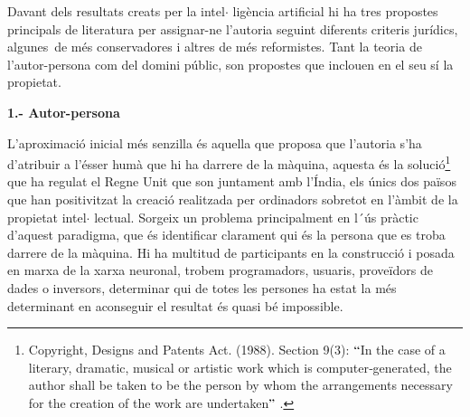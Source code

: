 \documentclass[12pt]{article}
\begin{document}
\vspace{\baselineskip}

\vspace{\baselineskip}
\begin{justify}
Davant dels resultats creats per la intel$ \cdot $ ligència artificial hi ha tres propostes principals de literatura per assignar-ne l’autoria seguint diferents criteris jurídics, algunes\ de més  conservadores i altres de més reformistes. Tant la teoria de l’autor-persona com del domini públic, son propostes que inclouen en el seu sí la propietat. 
\end{justify}\par


\vspace{\baselineskip}
\textbf{1.- Autor-persona}\par


\vspace{\baselineskip}
\begin{justify}
L’aproximació inicial més senzilla és aquella que proposa que l’autoria s’ha d’atribuir a l’ésser humà que hi ha darrere de la màquina, aquesta és la solució\footnote{ Copyright, Designs and Patents Act. (1988). Section 9(3): $``$In the case of a literary, dramatic, musical or artistic work which is computer‐generated, the author shall be taken to be the person by whom the arrangements necessary for the creation of the work are undertaken$"$ . } que  ha regulat el Regne Unit que son juntament amb l’Índia, els únics dos països que han positivitzat la creació realitzada per ordinadors sobretot en l’àmbit de la propietat intel$ \cdot $ lectual. Sorgeix un problema principalment en l´ús pràctic d’aquest paradigma, que és identificar clarament qui és la persona que es troba darrere de la màquina. Hi ha multitud de participants en la construcció i posada en marxa de la xarxa neuronal, trobem programadors, usuaris, proveïdors de dades o inversors, determinar qui de totes les persones ha estat la més determinant en aconseguir el resultat és quasi bé impossible.
\end{justify}\par
\end{document}
